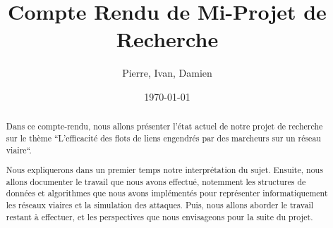 \documentclass[a4paper, 11pt]{article}
\title{Compte Rendu de Mi-Projet de Recherche}
\author{Pierre, Ivan, Damien}
\date{\today}
\begin{document}
\maketitle

\begin{abstract}
Dans ce compte-rendu, nous allons présenter l'état actuel de notre projet de recherche sur le thème ``L'efficacité des flots de liens engendrés par des marcheurs sur un réseau viaire``.

Nous expliquerons dans un premier temps notre interprétation du sujet.
Ensuite, nous allons documenter le travail que nous avons effectué, notemment les structures de données et algorithmes que nous avons implémentés pour représenter informatiquement les réseaux viaires et la simulation des attaques.
Puis, nous allons aborder le travail restant à effectuer, et les perspectives que nous envisageons pour la suite du projet.
\end{abstract}

\tableofcontents










\end{document}
